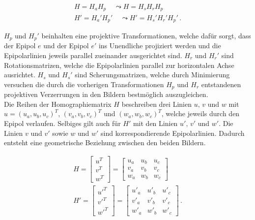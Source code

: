 \begin{gather}
	H = H_a H_p  \;\;\;\; \leadsto	H = H_s H_r H_p \\
	H' = H_a'H_p'\;\;\;\; \leadsto 	H' = H_s'H_r' H_p'\, .
\end{gather}


$H_p$ und $H_p'$ beinhalten eine projektive Transformationen, welche dafür sorgt, dass der Epipol $e$ und der Epipol $e'$ ins Unendliche projiziert werden und die Epipolarlinien jeweils parallel zueinander ausgerichtet sind\cite{ZZ,phdextrinsicPara}. $H_r$ und $H_r'$ sind Rotationsmatrizen, welche die Epipolarlinien parallel zur horizontalen Achse ausrichtet. $H_s$ und $H_s'$ sind Scherungsmatrizen, welche durch Minimierung versuchen die durch die vorherigen Transformationen $H_p$ und $H_r$ entstandenen projektiven Verzerrungen in den Bildern bestmöglich auszugleichen\cite{ZZ,phdextrinsicPara}.\\

Die Reihen der Homographiematrix $H$ beschreiben drei Linien $u, \, v$ und $w$ mit $u = (u_a,u_b,u_c)^T$, $(v_a,v_b,v_c)^T$ und $(w_a,w_b,w_c)^T$, welche jeweils durch den Epipol verlaufen. Selbiges gilt auch für $H'$ mit den Linien $u', \, v'$ und $w'$. Die Linien $v$ und $v'$ sowie $w$ und $w'$ sind korrespondierende Epipolarlinien. Dadurch entsteht eine geometrische Beziehung zwischen den beiden Bildern\cite{ZZ}.

\begin{gather}
	H = \begin{bmatrix}
		u^T\\v^T\\w^T
	\end{bmatrix} =
	\begin{bmatrix}
		u_a&u_b&u_c\\
		v_a&v_b&v_c\\
		w_a&w_b&w_c
	\end{bmatrix}\\
	H' = \begin{bmatrix}
		u'^T\\v'^T\\w'^T
	\end{bmatrix} =
	\begin{bmatrix}
		u'_a&u'_b&u'_c\\
		v'_a&v'_b&v'_c\\
		w'_a&w'_b&w'_c
	\end{bmatrix}\, .
\end{gather}\\

